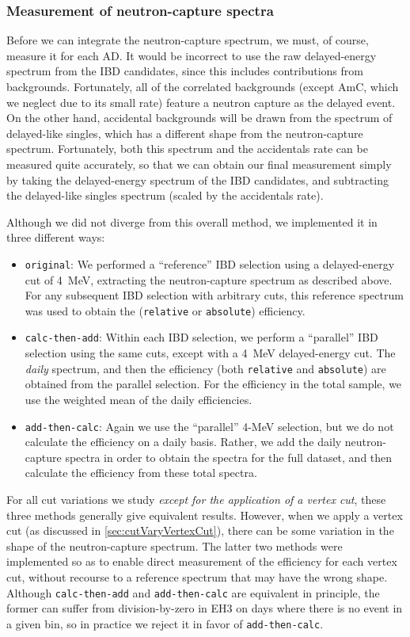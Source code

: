 \documentclass[../thesis.tex]{subfiles}
\begin{document}
\subsubsection{Measurement of neutron-capture spectra}
\label{sec:cutVaryDelCutSpecMeas}

Before we can integrate the neutron-capture spectrum, we must, of course, measure it for each AD. It would be incorrect to use the raw delayed-energy spectrum from the IBD candidates, since this includes contributions from backgrounds. Fortunately, all of the correlated backgrounds (except AmC, which we neglect due to its small rate) feature a neutron capture as the delayed event. On the other hand, accidental backgrounds will be drawn from the spectrum of delayed-like singles, which has a different shape from the neutron-capture spectrum. Fortunately, both this spectrum and the accidentals rate can be measured quite accurately, so that we can obtain our final measurement simply by taking the delayed-energy spectrum of the IBD candidates, and subtracting the delayed-like singles spectrum (scaled by the accidentals rate).

Although we did not diverge from this overall method, we implemented it in three different ways:

\begin{itemize}
\item \texttt{original}: We performed a ``reference'' IBD selection using a delayed-energy cut of 4~MeV, extracting the neutron-capture spectrum as described above. For any subsequent IBD selection with arbitrary cuts, this reference spectrum was used to obtain the (\texttt{relative} or \texttt{absolute}) efficiency.
\item \texttt{calc-then-add}: Within each IBD selection, we perform a ``parallel'' IBD selection using the same cuts, except with a 4~MeV delayed-energy cut. The \emph{daily} spectrum, and then the efficiency (both \texttt{relative} and \texttt{absolute}) are obtained from the parallel selection. For the efficiency in the total sample, we use the weighted mean of the daily efficiencies.
\item \texttt{add-then-calc}: Again we use the ``parallel'' 4-MeV selection, but we do not calculate the efficiency on a daily basis. Rather, we add the daily neutron-capture spectra in order to obtain the spectra for the full dataset, and then calculate the efficiency from these total spectra.
\end{itemize}

For all cut variations we study \emph{except for the application of a vertex cut}, these three methods generally give equivalent results. However, when we apply a vertex cut (as discussed in \autoref{sec:cutVaryVertexCut}), there can be some variation in the shape of the neutron-capture spectrum. The latter two methods were implemented so as to enable direct measurement of the efficiency for each vertex cut, without recourse to a reference spectrum that may have the wrong shape. Although \texttt{calc-then-add} and \texttt{add-then-calc} are equivalent in principle, the former can suffer from division-by-zero in EH3 on days where there is no event in a given bin, so in practice we reject it in favor of \texttt{add-then-calc}.
\end{document}
